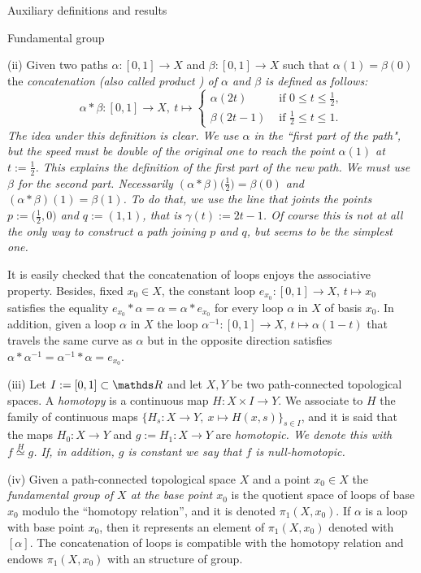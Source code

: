 \documentclass[11pt, a4paper, english, twoside, notitlepage, openright]{report}
\begin{document}
\begin{chapter}{Auxiliary definitions and results}
\begin{section}{Fundamental group}
\begin{definitions}
(ii) Given two paths $\alpha:[0,1]\to X$ and $\beta:[0,1]\to X$ such that  $\alpha(1)=\beta(0)$ the \em concatenation \em (also called \em product \em) of $\alpha$ and $\beta$ is defined as follows:
$$
\alpha*\beta:[0,1]\to X,\ t\mapsto
\left\{\begin{array}{ll}
\alpha(2t) &\text{ if } 0\leq t\leq\tfrac{1}{2},\\
\beta(2t-1) &\text{ if } \tfrac{1}{2}\leq t\leq1.
\end{array}
\right.
$$
The idea under this definition is clear. We use $\alpha$ in the ``first part of the path", but the speed must be double of the original one to reach the point $\alpha(1)$ at $t:=\tfrac{1}{2}$. This explains the definition of the first part of the new path. We must use $\beta$ for the second part. Necessarily $(\alpha*\beta)\big(\tfrac{1}{2}\big)=\beta(0)$ and $(\alpha*\beta)(1)=\beta(1)$. To do that, we use the line that joints the points $p:=\big(\tfrac{1}{2},0\big)$ and $q:=(1,1)$, that is $\gamma(t):=2t-1$. Of course this is not at all the only way to construct a path joining $p$ and $q$, but seems to be the simplest one.

It is easily checked that the concatenation of loops enjoys the associative property. Besides, fixed $x_0\in X$, the constant loop $e_{x_0}:[0,1]\to X,\, t\mapsto x_0$ satisfies the equality $e_{x_0}*\alpha=\alpha=\alpha*e_{x_0}$ for every loop $\alpha$ in $X$ of basis $x_0$. In addition, given a loop $\alpha$ in $X$ the loop $\alpha^{-1}:[0,1]\to X, \, t\mapsto\alpha(1-t)$ that travels the same curve as $\alpha$ but in the opposite direction satisfies $\alpha*\alpha^{-1}=\alpha^{-1}*\alpha=e_{x_0}$.

\vspace{1mm}

(iii) Let $I:=[0,1]\subset\R$ and let $X,Y$ be two path-connected topological spaces. A \emph{homotopy} is a continuous map $H: X\times I\to Y$. We associate to $H$ the family of continuous maps $\{H_s:X\to Y,\ x\mapsto H(x,s)\}_{s\in I}$, and it is said that the maps $H_0:X\to Y$ and $g:=H_1:X\to Y$ are \em homotopic. \em We denote this with $f\overset{H}{\simeq}g$. If, in addition, $g$ is constant we say that $f$ is \emph{null-homotopic}.

\vspace{1mm} 

(iv) Given a path-connected topological space $X$ and a point $x_0\in X$ the \emph{fundamental group of $X$ at the base point $x_0$} is the quotient space of loops of base $x_0$ modulo the ``homotopy relation'', and it is denoted $\pi_1(X,x_0)$. If $\alpha$ is a loop with base point $x_0$, then it represents an element of $\pi_1(X,x_0)$ denoted with $[\alpha]$. The concatenation of loops is compatible with the homotopy relation and endows $\pi_1(X,x_0)$ with an structure of group.


\end{definitions}
\end{section}
\end{chapter}
\end{document}
